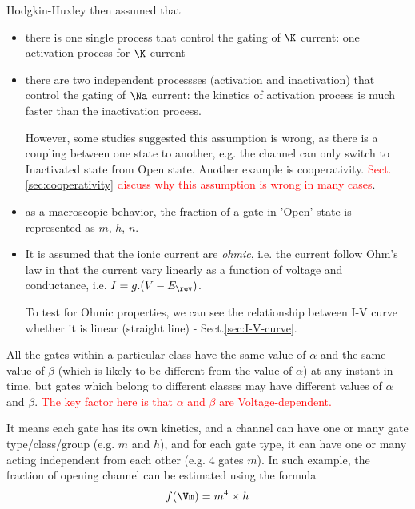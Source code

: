 Hodgkin-Huxley then assumed that 
\begin{itemize}
    
  \item there is one single process that control the
  gating of $\K$ current: one activation process for $\K$ current
  
  \item there are two independent processses (activation and inactivation) that
  control the gating of $\Na$ current:   the kinetics of activation process is
  much faster than the inactivation process.
  

However, some studies suggested this assumption is wrong, as there is a coupling
between one state to another, e.g. the channel can only switch to Inactivated
state from Open state. Another example is cooperativity.
\textcolor{red}{Sect.\ref{sec:cooperativity} discuss why this assumption is
wrong in many cases}.

  
  
  \item as a macroscopic behavior, the fraction of a gate in 'Open' state
  is represented as $m$, $h$, $n$.

  \item It is assumed that the ionic current are {\it ohmic}, i.e. the
current follow Ohm's law in that the current vary linearly as a function of
voltage and conductance, i.e. $I=g.(V-E_\rev)$.
  
To test for Ohmic properties, we can see the relationship between I-V curve
whether it is linear (straight line) - Sect.\ref{sec:I-V-curve}.
  
\end{itemize}


All the gates within a particular class have the same value of $\alpha$ and the
same value of $\beta$ (which is likely to be different from the value of
$\alpha$) at any instant in time, but gates which belong to different classes
may have different values of $\alpha$ and $\beta$. \textcolor{red}{The key
factor here is that $\alpha$ and $\beta$ are Voltage-dependent.}

It means each gate has its own kinetics, and a channel can have one or many gate
type/class/group (e.g. $m$ and $h$), and for each gate type, it can have one or
many acting independent from each other (e.g. 4 gates $m$). In such example, the
fraction of opening channel can be estimated using the formula
\begin{equation}
f(\Vm) = m^4 \times h
\end{equation}


